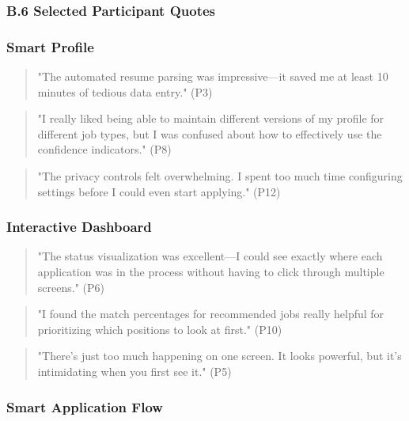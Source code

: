 \documentclass[
	letterpaper, %
]{jdf}
\begin{document}
\subsubsection{B.6 Selected Participant Quotes}

\subsubsection{Smart Profile}

\begin{quote}
"The automated resume parsing was impressive—it saved me at least 10 minutes of tedious data entry." (P3)
\end{quote}

\begin{quote}
"I really liked being able to maintain different versions of my profile for different job types, but I was confused about how to effectively use the confidence indicators." (P8)
\end{quote}

\begin{quote}
"The privacy controls felt overwhelming. I spent too much time configuring settings before I could even start applying." (P12)
\end{quote}

\subsubsection{Interactive Dashboard}

\begin{quote}
"The status visualization was excellent—I could see exactly where each application was in the process without having to click through multiple screens." (P6)
\end{quote}

\begin{quote}
"I found the match percentages for recommended jobs really helpful for prioritizing which positions to look at first." (P10)
\end{quote}

\begin{quote}
"There's just too much happening on one screen. It looks powerful, but it's intimidating when you first see it." (P5)
\end{quote}

\subsubsection{Smart Application Flow}
\end{document}
